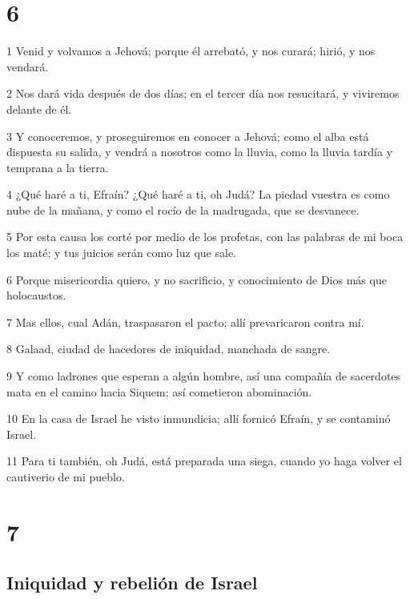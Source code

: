 \chapter{6}

\par 1 Venid y volvamos a Jehová; porque él arrebató, y nos curará; hirió, y nos vendará.
\par 2 Nos dará vida después de dos días; en el tercer día nos resucitará, y viviremos delante de él.
\par 3 Y conoceremos, y proseguiremos en conocer a Jehová; como el alba está dispuesta su salida, y vendrá a nosotros como la lluvia, como la lluvia tardía y temprana a la tierra.
\par 4 ¿Qué haré a ti, Efraín? ¿Qué haré a ti, oh Judá? La piedad vuestra es como nube de la mañana, y como el rocío de la madrugada, que se desvanece.
\par 5 Por esta causa los corté por medio de los profetas, con las palabras de mi boca los maté; y tus juicios serán como luz que sale.
\par 6 Porque misericordia quiero, y no sacrificio, y conocimiento de Dios más que holocaustos.
\par 7 Mas ellos, cual Adán, traspasaron el pacto; allí prevaricaron contra mí.
\par 8 Galaad, ciudad de hacedores de iniquidad, manchada de sangre.
\par 9 Y como ladrones que esperan a algún hombre, así una compañía de sacerdotes mata en el camino hacia Siquem; así cometieron abominación.
\par 10 En la casa de Israel he visto inmundicia; allí fornicó Efraín, y se contaminó Israel.
\par 11 Para ti también, oh Judá, está preparada una siega, cuando yo haga volver el cautiverio de mi pueblo.

\chapter{7}

\section*{Iniquidad y rebelión de Israel}

